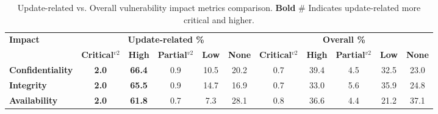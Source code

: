 \documentclass[fleqn,s1,names,tex]{neptune}
\begin{document}
\begin{table}[hline]
\caption{Update-related vs. Overall vulnerability impact metrics comparison. \textbf{Bold} \# Indicates update-related more critical and higher.}
\bstmfloatsrc
\begin{fsrc}
\tblfont
\begin{tabular*}{365pt}{@{}l|ccccc|ccccc@{}}
\toprule
\textbf{Impact} & \multicolumn{5}{c}{\textbf{Update-related \% }} & \multicolumn{5}{c}{\textbf{Overall \% }} \\ 
\cmidrule(lr){2-6} \cmidrule{7-11} 
& \textbf{Critical$^{v2}$} & \textbf{High} & \textbf{Partial$^{v2}$} & \textbf{Low} & \textbf{None} & \textbf{Critical$^{v2}$} & \textbf{High} & \textbf{Partial$^{v2}$} & \textbf{Low} & \textbf{None} \\ 
\midrule
\textbf{Confidentiality} & 
  \cellcolor{red!90}\textbf{2.0} & 
  \cellcolor{red!60}\textbf{66.4} & 
  \cellcolor{orange!40}0.9 & 
  \cellcolor{yellow!20}10.5 &
  
  \cellcolor{blue!10}20.2 & 
  \cellcolor{red!90}0.7 & 
  \cellcolor{red!60}39.4 & 
  \cellcolor{orange!40}4.5 & 
  \cellcolor{yellow!20}32.5 & 
  \cellcolor{blue!10}23.0 \\ 

\textbf{Integrity} & 
  \cellcolor{red!90}\textbf{2.0} & 
  \cellcolor{red!60}\textbf{65.5} & 
  \cellcolor{orange!40}0.9 & 
  \cellcolor{yellow!20}14.7 & 
  \cellcolor{blue!10}16.9 & 
  \cellcolor{red!90}0.7 & 
  \cellcolor{red!60}33.0 & 
  \cellcolor{orange!40}5.6 & 
  \cellcolor{yellow!20}35.9 & 
  \cellcolor{blue!10}24.8 \\ 

\textbf{Availability} & 
  \cellcolor{red!90}\textbf{2.0} & 
  \cellcolor{red!60}\textbf{61.8} & 
  \cellcolor{orange!40}0.7 & 
  \cellcolor{yellow!20}7.3 & 
  \cellcolor{blue!10}28.1 & 
  \cellcolor{red!90}0.8 & 
  \cellcolor{red!60}36.6 & 
  \cellcolor{orange!40}4.4 & 
  \cellcolor{yellow!20}21.2 & 
  \cellcolor{blue!10}37.1 \\ 
\bottomrule
\end{tabular*}
\end{fsrc}
\estmfloatsrc
\end{table}



\end{document}
